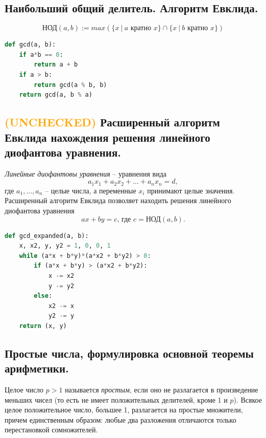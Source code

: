 \subsection{Наибольший общий делитель. Алгоритм Евклида.}
\[
\text{НОД}(a, b) := max (\{ x \> | \> a \text{ кратно } x \} \cap \{ x \> | \> b \text{ кратно } x \})
\]

\begin{lstlisting}[language=Python]
def gcd(a, b):
    if a*b == 0:
        return a + b
    if a > b:
        return gcd(a % b, b)
    return gcd(a, b % a)
\end{lstlisting}




\subsection{\textcolor{orange}{(UNCHECKED)} Расширенный алгоритм Евклида нахождения решения линейного диофантова уравнения.}
\textit{Линейные диофантовы уравнения} -- уравнения вида
\[
a_1x_1 + a_2x_2 + ... + a_nx_n = d,
\] где $a_1,...,a_n$ -- целые числа, а переменные $x_i$ принимают целые значения.
\newline
\newline
Расширенный алгоритм Евклида позволяет находить решения линейного диофантова уравнения 
\[
ax + by = c \text{, где } c = \text{НОД}(a,b).
\]
\begin{lstlisting}[language=Python]
def gcd_expanded(a, b):
    x, x2, y, y2 = 1, 0, 0, 1
    while (a*x + b*y)*(a*x2 + b*y2) > 0:
        if (a*x + b*y) > (a*x2 + b*y2):
            x -= x2
            y -= y2
        else:
            x2 -= x
            y2 -= y
    return (x, y)
\end{lstlisting}




\subsection{Простые числа, формулировка основной теоремы арифметики.}
Целое число $p > 1$ называется \textit{простым}, если оно не разлагается в произведение меньших чисел (то есть не имеет положительных делителей, кроме 1 и $p$).
\newline
\newline
Всякое целое положительное число, большее 1, разлагается на простые множители, причем единственным образом: любые два разложения отличаются только перестановкой сомножителей.



